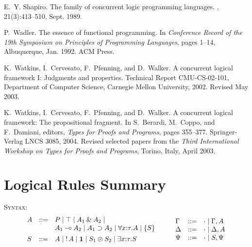 \documentclass{sig-alt}
\begin{document}
\begin{thebibliography}{50}
E.~Y. Shapiro.
\newblock The family of concurrent logic programming languages.
, 21(3):413--510, Sept. 1989.

P.~Wadler.
\newblock The essence of functional programming.
\newblock In {\em Conference Record of the 19th Symposium on Principles of
  Programming Languages}, pages 1--14, Albuquerque, Jan. 1992. ACM Press.

K.~Watkins, I.~Cervesato, F.~Pfenning, and D.~Walker.
\newblock A concurrent logical framework {I}: Judgments and properties.
\newblock Technical Report CMU-CS-02-101, Department of Computer Science,
  Carnegie Mellon University, 2002.
\newblock Revised May 2003.

K.~Watkins, I.~Cervesato, F.~Pfenning, and D.~Walker.
\newblock A concurrent logical framework: The propositional fragment.
\newblock In S.~Berardi, M.~Coppo, and F.~Damiani, editors, {\em Types for
  Proofs and Programs}, pages 355--377. Springer-Verlag LNCS 3085, 2004.
\newblock Revised selected papers from the {\em Third International Workshop on
  Types for Proofs and Programs}, Torino, Italy, April 2003.

\end{thebibliography}

\clearpage

\onecolumn

\appendix
\section{Logical Rules Summary}
\label{apx:logical-rules-summary}

\vspace{0.25cm}

\noindent \textsc{Syntax:}
$$
\begin{array}{lll}
A & ::= &  P 
      \mid \top 
      \mid A_1 \with A_2 
      \mid \\&& A_1 \limp A_2 
      \mid A_1 \iimp A_2 
      \mid \forall x{:}\tau.A  
      \mid \{ S \} 
\\[1ex]
S & ::= &  A
      \mid \bang A
      \mid \one 
      \mid S_1 \tensor S_2 
      \mid \exists x{:}\tau.S 
\end{array}
\qquad
\begin{array}{lll}
  \Gamma & ::= & \cdot \mid \Gamma, A \\
  \Delta & ::= & \cdot \mid \Delta, A \\%
  \Psi   & ::= & \cdot \mid S, \Psi \\
\end{array}
$$
\end{document}
